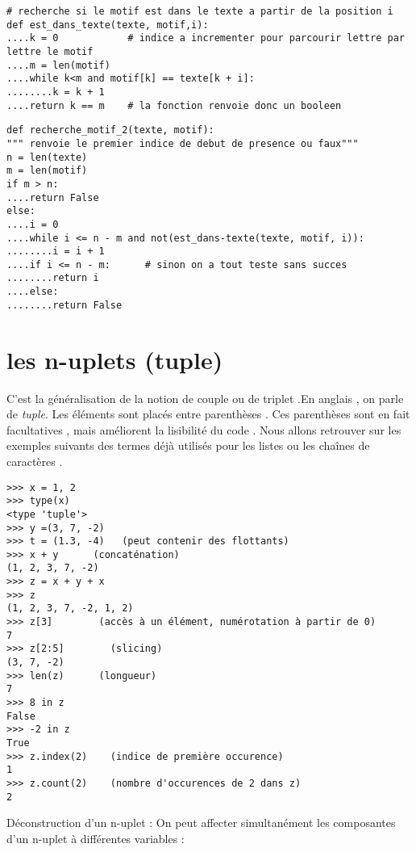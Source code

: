 \begin{lstlisting}[frame=lines, float=ht, caption={un deuxième programme}]
# recherche si le motif est dans le texte a partir de la position i
def est_dans_texte(texte, motif,i):
....k = 0            # indice a incrementer pour parcourir lettre par lettre le motif
....m = len(motif)
....while k<m and motif[k] == texte[k + i]:
........k = k + 1
....return k == m    # la fonction renvoie donc un booleen
\end{lstlisting}

\begin{lstlisting}[frame=lines, float=ht, caption={un deuxième programme}]
def recherche_motif_2(texte, motif):
""" renvoie le premier indice de debut de presence ou faux"""
n = len(texte)
m = len(motif)
if m > n:
....return False
else:
....i = 0
....while i <= n - m and not(est_dans-texte(texte, motif, i)):
........i = i + 1
....if i <= n - m:      # sinon on a tout teste sans succes
........return i
....else:
........return False
\end{lstlisting}\par
\par

\section{les n-uplets (tuple)}

C'est la généralisation de la notion de couple ou de triplet .En anglais , on parle de \textit{tuple}. Les éléments sont placés entre parenthèses . Ces parenthèses sont en fait facultatives , mais améliorent la lisibilité du code . Nous allons retrouver sur les exemples suivants des termes déjà utilisés pour les listes ou les chaînes de caractères . \par
\par
\begin{lstlisting}
>>> x = 1, 2
>>> type(x)
<type 'tuple'>
>>> y =(3, 7, -2)
>>> t = (1.3, -4)   (peut contenir des flottants)
>>> x + y      (concaténation)
(1, 2, 3, 7, -2)
>>> z = x + y + x
>>> z
(1, 2, 3, 7, -2, 1, 2)
>>> z[3]        (accès à un élément, numérotation à partir de 0)
7
>>> z[2:5]        (slicing)
(3, 7, -2)
>>> len(z)      (longueur)
7
>>> 8 in z
False
>>> -2 in z
True
>>> z.index(2)    (indice de première occurence)
1
>>> z.count(2)    (nombre d'occurences de 2 dans z)
2
\end{lstlisting}
\par
Déconstruction d'un n-uplet : On peut affecter simultanément les composantes d'un n-uplet à différentes variables :\par

